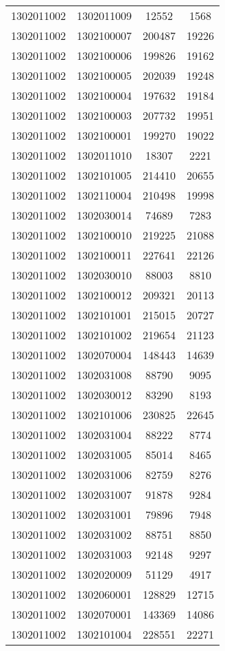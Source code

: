 \begin{longtable}{llcc}
1302011002 & 1302011009 & 12552 & 1568\\
1302011002 & 1302100007 & 200487 & 19226\\
1302011002 & 1302100006 & 199826 & 19162\\
1302011002 & 1302100005 & 202039 & 19248\\
1302011002 & 1302100004 & 197632 & 19184\\
1302011002 & 1302100003 & 207732 & 19951\\
1302011002 & 1302100001 & 199270 & 19022\\
1302011002 & 1302011010 & 18307 & 2221\\
1302011002 & 1302101005 & 214410 & 20655\\
1302011002 & 1302110004 & 210498 & 19998\\
1302011002 & 1302030014 & 74689 & 7283\\
1302011002 & 1302100010 & 219225 & 21088\\
1302011002 & 1302100011 & 227641 & 22126\\
1302011002 & 1302030010 & 88003 & 8810\\
1302011002 & 1302100012 & 209321 & 20113\\
1302011002 & 1302101001 & 215015 & 20727\\
1302011002 & 1302101002 & 219654 & 21123\\
1302011002 & 1302070004 & 148443 & 14639\\
1302011002 & 1302031008 & 88790 & 9095\\
1302011002 & 1302030012 & 83290 & 8193\\
1302011002 & 1302101006 & 230825 & 22645\\
1302011002 & 1302031004 & 88222 & 8774\\
1302011002 & 1302031005 & 85014 & 8465\\
1302011002 & 1302031006 & 82759 & 8276\\
1302011002 & 1302031007 & 91878 & 9284\\
1302011002 & 1302031001 & 79896 & 7948\\
1302011002 & 1302031002 & 88751 & 8850\\
1302011002 & 1302031003 & 92148 & 9297\\
1302011002 & 1302020009 & 51129 & 4917\\
1302011002 & 1302060001 & 128829 & 12715\\
1302011002 & 1302070001 & 143369 & 14086\\
1302011002 & 1302101004 & 228551 & 22271\\

\end{longtable}
